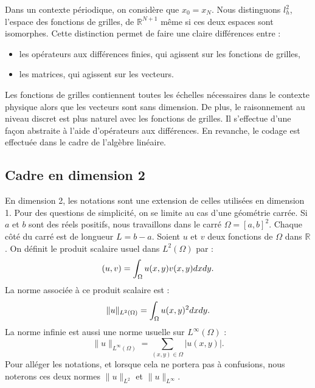 Dans un contexte périodique, on considère que $x_0 = x_N$.
Nous distinguons $l^2_h$, l'espace des fonctions de grilles, de $\mathbb{R}^{N+1}$ même si ces deux espaces sont isomorphes. Cette distinction permet de faire une claire différences entre :
\begin{itemize}
\item les opérateurs aux différences finies, qui agissent sur les fonctions de grilles,
\item les matrices, qui agissent sur les vecteurs.
\end{itemize}
Les fonctions de grilles contiennent toutes les échelles nécessaires dans le contexte physique alors que les vecteurs sont sans dimension. De plus, le raisonnement au niveau discret est plus naturel avec les fonctions de grilles. Il s'effectue d'une façon abstraite à l'aide d'opérateurs aux différences. En revanche, le codage est effectuée dans le cadre de l'algèbre linéaire.












\subsection{Cadre en dimension 2}
\label{sec:notation_2D}

En dimension 2, les notations sont une extension de celles utilisées en dimension 1. Pour des questions de simplicité, on se limite au cas d'une géométrie carrée. Si $a$ et $b$ sont des réels positifs, nous travaillons dans le carré $\Omega = [a,b]^2$. Chaque côté du carré est de longueur $L=b-a$. 
Soient $u$ et $v$ deux fonctions de $\Omega$ dans $\mathbb{R}$. On définit le produit scalaire usuel dans $L^2 ( \Omega ) $ par :
\begin{equation}
(u,v) = \displaystyle\int_{\Omega} u(x,y) v(x,y) dx dy.
\end{equation}
La norme associée à ce produit scalaire est :
\begin{equation}
\| u \|_{L^2(\Omega)} = \displaystyle\int_{\Omega} u(x,y)^2 dx dy. 
\end{equation}
La norme infinie est aussi une norme usuelle sur $L^{\infty}(\Omega)$ :
\begin{equation}
\| u \|_{L^{\infty} ( \Omega )} = \sum_{(x,y) \in \Omega} |u(x,y)|.
\end{equation}
Pour alléger les notations, et lorsque cela ne portera pas à confusions, nous noterons ces deux normes $\| u \|_{L^2}$ et $\| u \|_{L^{\infty}}$.

